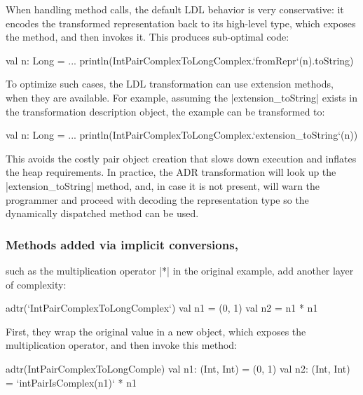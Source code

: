 When handling method calls, the default LDL behavior is very conservative: it encodes the transformed representation back to its high-level type, which exposes the method, and then invokes it. This produces sub-optimal code:

\begin{lstlisting-nobreak}
val n: Long = ...
println(IntPairComplexToLongComplex.`fromRepr`(n).toString)
\end{lstlisting-nobreak}

To optimize such cases, the LDL transformation can use extension methods, when they are available. For example, assuming the |extension_toString| exists in the transformation description object, the example can be transformed to:

\begin{lstlisting-nobreak}
val n: Long = ...
println(IntPairComplexToLongComplex.`extension_toString`(n))
\end{lstlisting-nobreak}

This avoids the costly pair object creation that slows down execution and inflates the heap requirements. In practice, the ADR transformation will look up the |extension_toString| method, and, in case it is not present, will warn the programmer and proceed with decoding the representation type so the dynamically dispatched method can be used.

\subsubsection{Methods added via implicit conversions,} such as the multiplication operator |*| in the original example, add another layer of complexity:

\begin{lstlisting-nobreak}
adtr(`IntPairComplexToLongComplex`) {
  val n1 = (0, 1)
  val n2 = n1 * n1
}
\end{lstlisting-nobreak}

First, they wrap the original value in a new object, which exposes the multiplication operator, and then invoke this method:

\begin{lstlisting-nobreak}
adtr(IntPairComplexToLongComple) {
  val n1: (Int, Int) = (0, 1)
  val n2: (Int, Int) = `intPairIsComplex(n1)` * n1
}
\end{lstlisting-nobreak}

